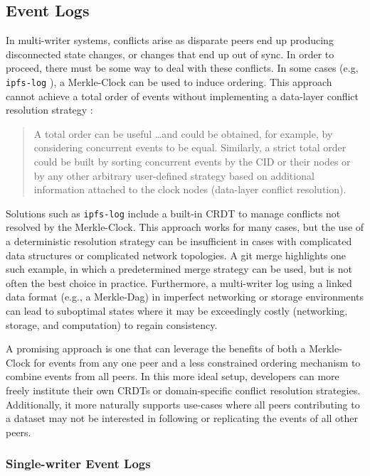 \documentclass{textile}
\begin{document}
\subsection{Event Logs}

In multi-writer systems, conflicts arise as disparate peers end up producing disconnected state changes, or changes that end up out of sync. In order to proceed, there must be some way to deal with these conflicts. In some cases (e.g, \texttt{ipfs-log} \cite{markroberthendersonOrbitDBFieldManual2019}), a Merkle-Clock can be used to induce ordering. This approach cannot achieve a total order of events without implementing a data-layer conflict resolution strategy \cite{sanjuanMerkleCRDTs2019}:

\begin{quote}
A total order can be useful \dots and could be obtained, for example, by considering concurrent events to be equal. Similarly, a strict total order could be built by sorting concurrent events by the CID or their nodes or by any other arbitrary user-defined strategy based on additional information attached to the clock nodes (data-layer conflict resolution).
\end{quote}

Solutions such as \texttt{ipfs-log} include a built-in CRDT to manage conflicts not resolved by the Merkle-Clock. This approach works for many cases, but the use of a deterministic resolution strategy can be insufficient in cases with complicated data structures or complicated network topologies. A git merge highlights one such example, in which a predetermined merge strategy can be used, but is not often the best choice in practice. Furthermore, a multi-writer log using a linked data format (e.g., a Merkle-Dag) in imperfect networking or storage environments can lead to suboptimal states where it may be exceedingly costly (networking, storage, and computation) to regain consistency.

A promising approach is one that can leverage the benefits of both a Merkle-Clock for events from any one peer and a less constrained ordering mechanism to combine events from all peers. In this more ideal setup, developers can more freely institute their own CRDTs or domain-specific conflict resolution strategies. Additionally, it more naturally supports use-cases where all peers contributing to a dataset may not be interested in following or replicating the events of all other peers. 

\subsubsection{Single-writer Event Logs}
\end{document}
